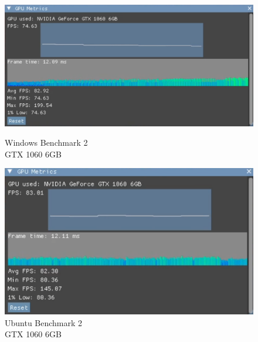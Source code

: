 \begin{figure}[ht]
    \centering
    \begin{minipage}[b]{0.48\textwidth}
        \centering
        \includegraphics[width=\textwidth]{images/windows-3.png}
        \caption{Windows Benchmark 2 \\ \hspace*{6em} GTX 1060 6GB}
        \label{fig:1060-windows-test-2}
    \end{minipage}
    \hfill
    \begin{minipage}[b]{0.40\textwidth}
        \centering
        \includegraphics[width=\textwidth]{images/linux-3.png}
        \caption{Ubuntu Benchmark 2 \\ \hspace*{6em} GTX 1060 6GB}
        \label{fig:1060-linux-test-2}
    \end{minipage}
\end{figure}

